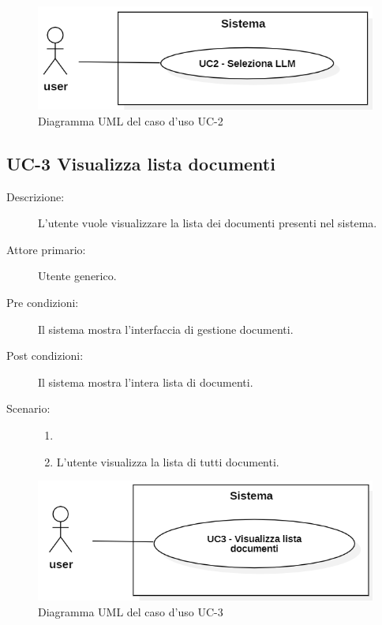 \begin{figure}[H]
    \centering
    \includegraphics[width=0.8\linewidth]{UC2.PNG}
    \caption{Diagramma UML del caso d'uso UC-2}
\end{figure}

\subsection{UC-3 Visualizza lista documenti}
\begin{description}
    \item[Descrizione:] L’utente vuole visualizzare la lista dei documenti presenti nel sistema.
    \item[Attore primario:] Utente generico.
    \item[Pre condizioni:] Il sistema mostra l’interfaccia di gestione documenti.
    \item[Post condizioni:] Il sistema mostra l’intera lista di documenti.
    \item[Scenario:] 
    \begin{enumerate}
        \item[]
        \item L’utente visualizza la lista di tutti documenti.
    \end{enumerate}
\end{description}

\begin{figure}[H]
    \centering
    \includegraphics[width=0.8\linewidth]{UC3.PNG}
    \caption{Diagramma UML del caso d'uso UC-3}
    \label{fig:UC3}
\end{figure}

